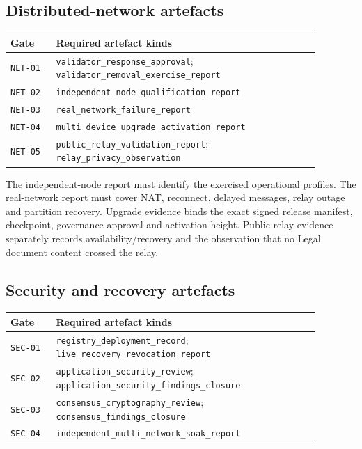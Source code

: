 \subsection{Distributed-network artefacts}

\begin{center}
\begin{tabular}{p{0.13\linewidth}p{0.75\linewidth}}
\hline
\textbf{Gate} & \textbf{Required artefact kinds} \\
\hline
\texttt{NET-01} & \texttt{validator\_response\_approval};
\texttt{validator\_removal\_exercise\_report} \\
\texttt{NET-02} & \texttt{independent\_node\_qualification\_report} \\
\texttt{NET-03} & \texttt{real\_network\_failure\_report} \\
\texttt{NET-04} & \texttt{multi\_device\_upgrade\_activation\_report} \\
\texttt{NET-05} & \texttt{public\_relay\_validation\_report};
\texttt{relay\_privacy\_observation} \\
\hline
\end{tabular}
\end{center}

The independent-node report must identify the exercised operational profiles.  The
real-network report must cover NAT, reconnect, delayed messages, relay outage and
partition recovery.  Upgrade evidence binds the exact signed release manifest,
checkpoint, governance approval and activation height.  Public-relay evidence
separately records availability/recovery and the observation that no Legal document
content crossed the relay.

\subsection{Security and recovery artefacts}

\begin{center}
\begin{tabular}{p{0.13\linewidth}p{0.75\linewidth}}
\hline
\textbf{Gate} & \textbf{Required artefact kinds} \\
\hline
\texttt{SEC-01} & \texttt{registry\_deployment\_record};
\texttt{live\_recovery\_revocation\_report} \\
\texttt{SEC-02} & \texttt{application\_security\_review};
\texttt{application\_security\_findings\_closure} \\
\texttt{SEC-03} & \texttt{consensus\_cryptography\_review};
\texttt{consensus\_findings\_closure} \\
\texttt{SEC-04} & \texttt{independent\_multi\_network\_soak\_report} \\
\hline
\end{tabular}
\end{center}

